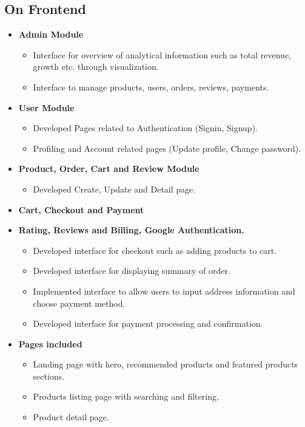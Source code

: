 \documentclass[12pt, a4paper, oneside]{article}
\begin{document}
\break
 \subsection{On Frontend}
  \begin{itemize}
      \item \textbf{Admin Module}
         \begin{itemize}
            \item{Interface for overview of analytical information such as total revenue, growth etc. through visualization.}
            \item{Interface to manage products, users, orders, reviews, payments.}
          
         \end{itemize}
     \item \textbf{User Module}
         \begin{itemize}
             \item{Developed Pages related to Authentication (Signin, Signup).}
             \item{Profiling and Account related pages (Update profile, Change password).}
         \end{itemize}
     \item \textbf{Product, Order, Cart and  Review Module}
        \begin{itemize}
           \item{Developed Create, Update and Detail page.}
        \end{itemize}
    \item \textbf{Cart, Checkout and Payment}
       \item \textbf{Rating, Reviews and Billing, Google Authentication.}
       \begin{itemize}
          \item{Developed interface for checkout such as adding products to cart.}
          \item{Developed interface for displaying summary of order.}
          \item{Implemented interface to allow users to input address information and choose payment method.} 
          \item{Developed interface for payment processing and confirmation.}
       \end{itemize}
       
   \item \textbf{Pages included}
       \begin{itemize}
             \item{Landing page with hero, recommended products and featured products sections.}
             \item{Products listing page with searching and filtering.}
             \item{Product detail page.}
       \end{itemize}
  \end{itemize}
\end{document}
